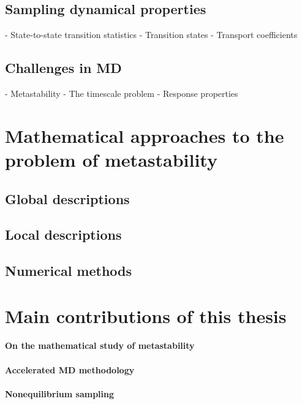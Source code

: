 \subsection{Sampling dynamical properties}
- State-to-state transition statistics
- Transition states
- Transport coefficients

\subsection{Challenges in MD}
- Metastability
- The timescale problem
- Response properties

\section{Mathematical approaches to the problem of metastability}
\label{sec:01:metastability}
\subsection{Global descriptions}
\subsection{Local descriptions}
\subsection{Numerical methods}

\section{Main contributions of this thesis}
\label{sec:01:contributions}
\paragraph{On the mathematical study of metastability}
\paragraph{Accelerated MD methodology}
\paragraph{Nonequilibrium sampling}